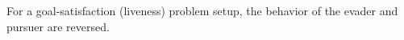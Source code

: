 \noindent For a goal-satisfaction (liveness) problem setup, the behavior of the evader and pursuer are reversed.





